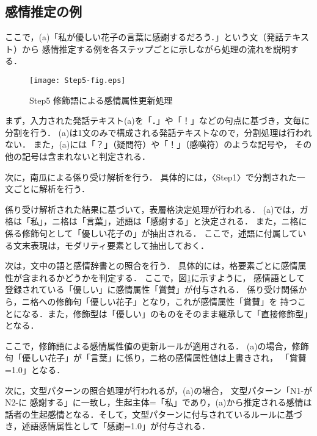 \documentclass[japanese]{jnlp_1.3c}
\begin{document}
\subsection{感情推定の例}

ここで，(a)「私が優しい花子の言葉に感謝するだろう．」という文（発話テキスト）から
感情推定する例を各ステップごとに示しながら処理の流れを説明する．

\begin{figure}[b]
\begin{center}
    \texttt{[image: Step5-fig.eps]}
\caption{Step5 修飾語による感情属性更新処理}
\label{fig:step5}
\end{center}
\end{figure}

\newcommand{\StepLabel}[1]{}
    \StepLabel{〈Step1〉}
まず，入力された発話テキスト(a)を「．」や「！」などの句点に基づき，文毎に分割を行う．
(a)は1文のみで構成される発話テキストなので，分割処理は行われない．
また，(a)には「？」（疑問符）や「！」（感嘆符）のような記号や，
その他の記号は含まれないと判定される．

    \StepLabel{〈Step2〉}
次に，南瓜による係り受け解析を行う．
具体的には，〈Step1〉で分割された一文ごとに解析を行う．

\StepLabel{〈Step3〉}
係り受け解析された結果に基づいて，表層格決定処理が行われる．
(a)では，ガ格は「私」，ニ格は「言葉」，述語は「感謝する」と決定される．
また，ニ格に係る修飾句として「優しい花子の」が抽出される．
ここで，述語に付属している文末表現は，モダリティ要素として抽出しておく．

    \StepLabel{〈Step4〉}
次は，文中の語と感情辞書との照合を行う．
具体的には，格要素ごとに感情属性が含まれるかどうかを判定する．
ここで，図\ref{fig:step5}に示すように，
感情語として登録されている「優しい」に感情属性「賞賛」が付与される．
係り受け関係から，ニ格への修飾句「優しい花子」となり，これが感情属性「賞賛」を
持つことになる．また，修飾型は「優しい」のものをそのまま継承して「直接修飾型」となる．

    \StepLabel{〈Step5〉}
ここで，修飾語による感情属性値の更新ルールが適用される．
(a)の場合，修飾句「優しい花子」が「言葉」に係り，ニ格の感情属性値は上書きされ，
「賞賛=1.0」となる．

    \StepLabel{〈Step6〉}
次に，文型パターンの照合処理が行われるが，(a)の場合，
文型パターン「N1-が N2-に 感謝する」に一致し，生起主体=「私」であり，(a)から推定される感情は
話者の生起感情となる．そして，文型パターンに付与されているルールに基づき，述語感情属性として「感謝=1.0」が付与される．
\end{document}
